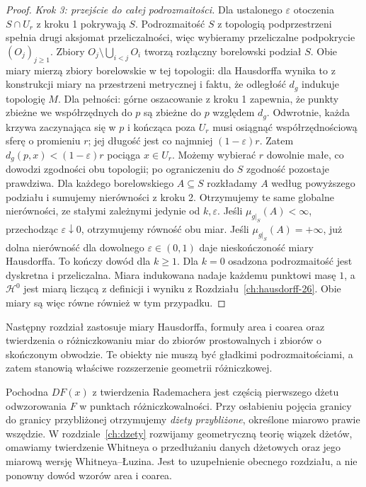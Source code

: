 \begin{proof}
\emph{Krok 3: przejście do całej podrozmaitości.}
Dla ustalonego $\varepsilon$ otoczenia $S\cap U_r$
z kroku 1 pokrywają $S$. Podrozmaitość $S$ z topologią
podprzestrzeni spełnia drugi aksjomat przeliczalności,
więc wybieramy przeliczalne podpokrycie $(O_j)_{j\ge1}$.
Zbiory $O_j\setminus\bigcup_{i<j}O_i$ tworzą rozłączny
borelowski podział $S$. Obie miary mierzą zbiory
borelowskie w tej topologii: dla Hausdorffa wynika
to z konstrukcji miary na przestrzeni metrycznej
i faktu, że odległość $d_g$ indukuje topologię $M$.
Dla pełności: górne oszacowanie z kroku 1 zapewnia,
że punkty zbieżne we współrzędnych do $p$ są zbieżne
do $p$ względem $d_g$. Odwrotnie, każda krzywa
zaczynająca się w $p$ i kończąca poza $U_r$
musi osiągnąć współrzędnościową sferę o promieniu $r$;
jej długość jest co najmniej $(1-\varepsilon)r$.
Zatem $d_g(p,x)<(1-\varepsilon)r$ pociąga $x\in U_r$.
Możemy wybierać $r$ dowolnie małe, co dowodzi
zgodności obu topologii; po ograniczeniu do $S$
zgodność pozostaje prawdziwa.
Dla każdego borelowskiego $A\subseteq S$ rozkładamy
$A$ według powyższego podziału i sumujemy nierówności
z kroku 2. Otrzymujemy te same globalne nierówności,
ze stałymi zależnymi jedynie od $k,\varepsilon$.
Jeśli $\mu_{g|_S}(A)<\infty$, przechodząc
$\varepsilon\downarrow0$, otrzymujemy równość obu miar.
Jeśli $\mu_{g|_S}(A)=+\infty$, już dolna nierówność
dla dowolnego $\varepsilon\in(0,1)$ daje nieskończoność
miary Hausdorffa. To kończy dowód dla $k\ge1$.
Dla $k=0$ osadzona podrozmaitość jest dyskretna
i przeliczalna. Miara indukowana nadaje każdemu
punktowi masę $1$, a $\mathcal H^0$ jest miarą
liczącą z definicji i wyniku z Rozdziału~\ref{ch:hausdorff-26}.
Obie miary są więc równe również w tym przypadku.
\end{proof}

\begin{uwaga}
Następny rozdział zastosuje miary Hausdorffa,
formuły area i coarea oraz twierdzenia o
różniczkowaniu miar do zbiorów prostowalnych
i zbiorów o skończonym obwodzie. Te obiekty
nie muszą być gładkimi podrozmaitościami,
a zatem stanowią właściwe rozszerzenie
geometrii różniczkowej.
\end{uwaga}

\begin{uwaga}
Pochodna $DF(x)$ z twierdzenia Rademachera jest częścią
pierwszego dżetu odwzorowania $F$ w punktach różniczkowalności.
Przy osłabieniu pojęcia granicy do granicy przybliżonej otrzymujemy
\emph{dżety przybliżone}, określone miarowo prawie wszędzie.
W rozdziale~\ref{ch:dzety} rozwijamy geometryczną teorię wiązek
dżetów, omawiamy twierdzenie Whitneya o przedłużaniu danych
dżetowych oraz jego miarową wersję Whitneya--Łuzina.
Jest to uzupełnienie obecnego rozdziału, a nie ponowny dowód
wzorów area i coarea.
\end{uwaga}
